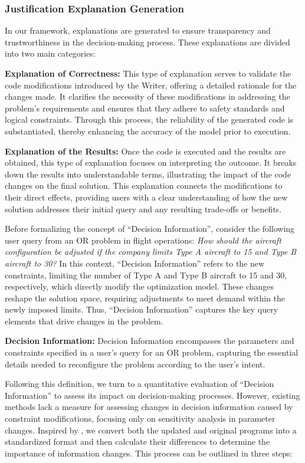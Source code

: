\subsubsection{Justification Explanation Generation}

In our framework, explanations are generated to ensure transparency and trustworthiness in the decision-making process. These explanations are divided into two main categories:

\textbf{Explanation of Correctness:} This type of explanation serves to validate the code modifications introduced by the Writer, offering a detailed rationale for the changes made. It clarifies the necessity of these modifications in addressing the problem's requirements and ensures that they adhere to safety standards and logical constraints. Through this process, the reliability of the generated code is substantiated, thereby enhancing the accuracy of the model prior to execution.

\textbf{Explanation of the Results:} Once the code is executed and the results are obtained, this type of explanation focuses on interpreting the outcome. It breaks down the results into understandable terms, illustrating the impact of the code changes on the final solution. This explanation connects the modifications to their direct effects, providing users with a clear understanding of how the new solution addresses their initial query and any resulting trade-offs or benefits.

Before formalizing the concept of ``Decision Information'', consider the following user query from an OR problem in flight operations: \textit{How should the aircraft configuration be adjusted if the company limits Type A aircraft to 15 and Type B aircraft to 30?} In this context, ``Decision Information'' refers to the new constraints, limiting the number of Type A and Type B aircraft to 15 and 30, respectively, which directly modify the optimization model. These changes reshape the solution space, requiring adjustments to meet demand within the newly imposed limits. Thus, ``Decision Information'' captures the key query elements that drive changes in the problem.
\begin{definition}
\textbf{Decision Information:} Decision Information encompasses the parameters and constraints specified in a user’s query for an OR problem, capturing the essential details needed to reconfigure the problem according to the user’s intent.
\end{definition}

Following this definition, we turn to a quantitative evaluation of ``Decision Information'' to assess its impact on decision-making processes. However, existing methods lack a measure for assessing changes in decision information caused by constraint modifications, focusing only on sensitivity analysis in parameter changes. Inspired by \citep{xing2024towards}, we convert both the updated and original programs into a standardized format and then calculate their differences to determine the importance of information changes. This process can be outlined in three steps:

